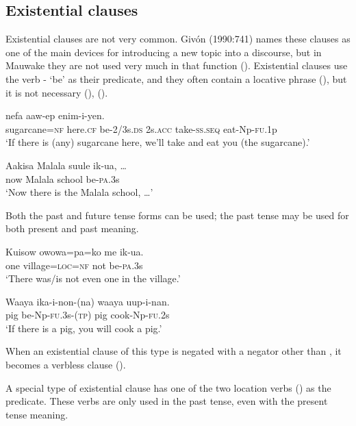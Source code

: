 \subsection{Existential clauses}
\hypertarget{RefHeading22121935131865}{}
Existential clauses are not very common. Giv\'on (1990:741) names these clauses as one of the main devices for introducing a new topic into a discourse, but in Mauwake they are not used very much in that function (). Existential clauses use the verb - `be' as their predicate, and they often contain a locative phrase (), but it is not necessary (), (). 

\ea%
\label{ex:x970}
\gll {}     nefa  aaw-ep  enim-i-yen. \\
     sugarcane=\textsc{nf}  here.\textsc{cf}  be-2/3s.\textsc{ds}  2s.\textsc{acc}  take-\textsc{ss}.\textsc{seq}  eat-Np-\textsc{fu}.1p \\
\glt `If there is (any) sugarcane here, we'll take and eat you (the sugarcane).'
\z

\ea%
\label{ex:x971}
\gll Aakisa  Malala  suule  ik-ua,  {\dots} \\
     now  Malala  school  be-\textsc{pa}.3s \\
\glt `Now there is the Malala school, {\dots}'
\z

Both the past and future tense forms can be used; the past tense may be used for both present and past meaning. 

\ea%
\label{ex:x1068}
\gll Kuisow  owowa=pa=ko  me  ik-ua. \\
     one  village=\textsc{loc}=\textsc{nf}  not  be-\textsc{pa}.3s \\
\glt `There was/is not even one in the village.'
\z

\ea%
\label{ex:x1067}
\gll Waaya  ika-i-non-(na)  waaya  uup-i-nan. \\
     pig  be-Np-\textsc{fu}.3s-(\textsc{tp})  pig  cook-Np-\textsc{fu}.2s \\
\glt `If there is a pig, you will cook a pig.'
\z

When an existential clause of this type is negated with a negator other than , it becomes a verbless clause ().

A special type of existential clause has one of the two location verbs () as the predicate. These verbs are only used in the past tense, even with the present tense meaning.

